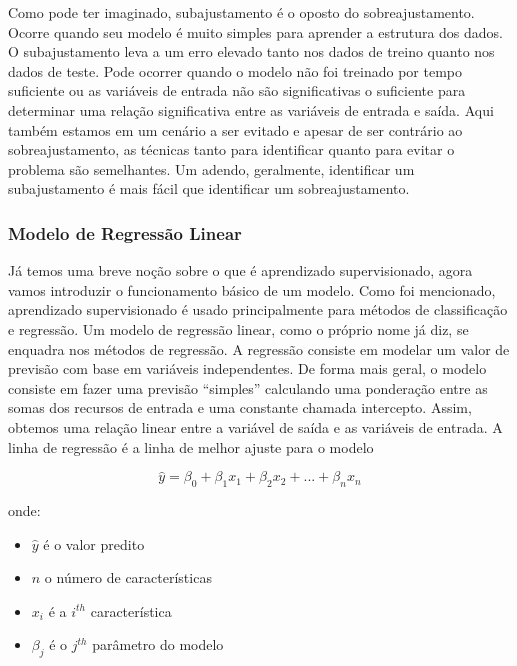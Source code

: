 \documentclass[
  letterpaper,
  DIV=11,
  numbers=noendperiod]{scrreprt}
\begin{document}
Como pode ter imaginado, subajustamento é o oposto do sobreajustamento.
Ocorre quando seu modelo é muito simples para aprender a estrutura dos
dados. O subajustamento leva a um erro elevado tanto nos dados de treino
quanto nos dados de teste. Pode ocorrer quando o modelo não foi treinado
por tempo suficiente ou as variáveis \hspace{0pt}\hspace{0pt}de entrada
não são significativas o suficiente para determinar uma relação
significativa entre as variáveis \hspace{0pt}\hspace{0pt}de entrada e
saída. Aqui também estamos em um cenário a ser evitado e apesar de ser
contrário ao sobreajustamento, as técnicas tanto para identificar quanto
para evitar o problema são semelhantes. Um adendo, geralmente,
identificar um subajustamento é mais fácil que identificar um
sobreajustamento.

\hypertarget{modelo-de-regressuxe3o-linear}{%
\subsubsection{Modelo de Regressão
Linear}\label{modelo-de-regressuxe3o-linear}}

Já temos uma breve noção sobre o que é aprendizado supervisionado, agora
vamos introduzir o funcionamento básico de um modelo. Como foi
mencionado, aprendizado supervisionado é usado principalmente para
métodos de classificação e regressão. Um modelo de regressão linear,
como o próprio nome já diz, se enquadra nos métodos de regressão. A
regressão consiste em modelar um valor de previsão com base em variáveis
independentes. De forma mais geral, o modelo consiste em fazer uma
previsão ``simples'' calculando uma ponderação entre as somas dos
recursos de entrada e uma constante chamada intercepto. Assim, obtemos
uma relação linear entre a variável de saída e as variáveis de entrada.
A linha de regressão é a linha de melhor ajuste para o modelo

\[
\hat y = \beta_0 + \beta_1x_1 + \beta_2x_2 + ...+ \beta_nx_n
\]

onde:

\begin{itemize}
\item
  \(\hat y\) é o valor predito
\item
  \(n\) o número de características
\item
  \(x_i\) é a \(i^{th}\) característica
\item
  \(\beta_j\) é o \(j^{th}\) parâmetro do modelo
\end{itemize}
\end{document}
